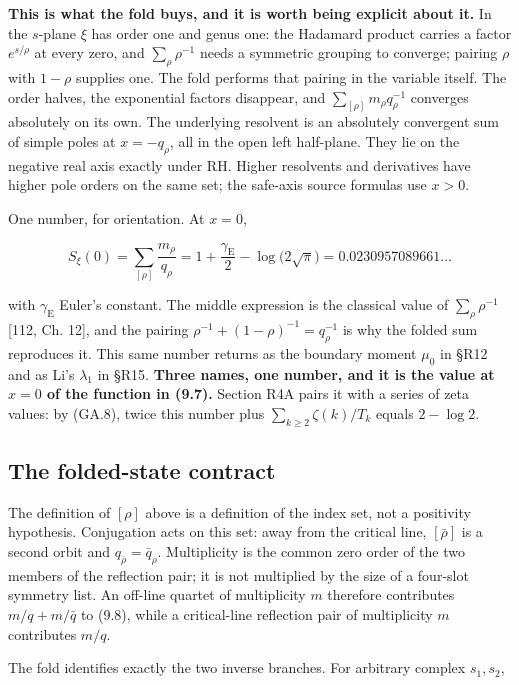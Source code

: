 \documentclass[
  11pt,
]{book}
\begin{document}
\textbf{This is what the fold buys, and it is worth being explicit about
it.} In the \(s\)-plane \(\xi\) has order one and genus one: the
Hadamard product carries a factor \(e^{s/\rho}\) at every zero, and
\(\sum_\rho\rho^{-1}\) needs a symmetric grouping to converge; pairing
\(\rho\) with \(1-\rho\) supplies one. The fold performs that pairing in
the variable itself. The order halves, the exponential factors
disappear, and \(\sum_{[\rho]}m_\rho q_\rho^{-1}\) converges absolutely
on its own. The underlying resolvent is an absolutely convergent sum of
simple poles at \(x=-q_\rho\), all in the open left half-plane. They lie
on the negative real axis exactly under RH. Higher resolvents and
derivatives have higher pole orders on the same set; the safe-axis
source formulas use \(x>0\).

One number, for orientation. At \(x=0\),

\[
S_\xi(0)=\sum_{[\rho]}\frac{m_\rho}{q_\rho}
=1+\frac{\gamma_{\mathrm E}}2-\log\bigl(2\sqrt\pi\bigr)
=0.0230957089661\ldots
\tag{9.8}
\]

with \(\gamma_{\mathrm E}\) Euler's constant. The middle expression is
the classical value of \(\sum_\rho\rho^{-1}\) {[}112, Ch. 12{]}, and the
pairing \(\rho^{-1}+(1-\rho)^{-1}=q_\rho^{-1}\) is why the folded sum
reproduces it. This same number returns as the boundary moment \(\mu_0\)
in §R12 and as Li's \(\lambda_1\) in §R15. \textbf{Three names, one
number, and it is the value at \(x=0\) of the function in (9.7).}
Section R4A pairs it with a series of zeta values: by (GA.8), twice this
number plus \(\sum_{k\ge2}\zeta(k)/T_k\) equals \(2-\log2\).

\subsection{The folded-state contract}\label{the-folded-state-contract}

The definition of \([\rho]\) above is a definition of the index set, not
a positivity hypothesis. Conjugation acts on this set: away from the
critical line, \([\bar\rho]\) is a second orbit and
\(q_{\bar\rho}=\bar q_\rho\). Multiplicity is the common zero order of
the two members of the reflection pair; it is not multiplied by the size
of a four-slot symmetry list. An off-line quartet of multiplicity \(m\)
therefore contributes \(m/q+m/\bar q\) to (9.8), while a critical-line
reflection pair of multiplicity \(m\) contributes \(m/q\).

The fold identifies exactly the two inverse branches. For arbitrary
complex \(s_1,s_2\),
\end{document}
